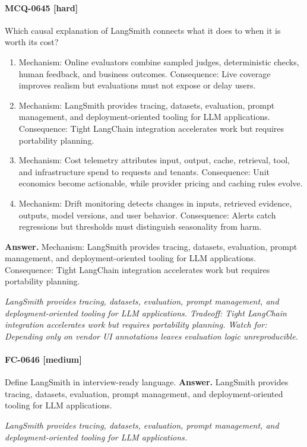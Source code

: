 \paragraph{MCQ-0645 [hard]} Which causal explanation of LangSmith connects what it does to when it is worth its cost?
\begin{enumerate}[label=\Alph*.]
\item Mechanism: Online evaluators combine sampled judges, deterministic checks, human feedback, and business outcomes. Consequence: Live coverage improves realism but evaluations must not expose or delay users.
\item Mechanism: LangSmith provides tracing, datasets, evaluation, prompt management, and deployment-oriented tooling for LLM applications. Consequence: Tight LangChain integration accelerates work but requires portability planning.
\item Mechanism: Cost telemetry attributes input, output, cache, retrieval, tool, and infrastructure spend to requests and tenants. Consequence: Unit economics become actionable, while provider pricing and caching rules evolve.
\item Mechanism: Drift monitoring detects changes in inputs, retrieved evidence, outputs, model versions, and user behavior. Consequence: Alerts catch regressions but thresholds must distinguish seasonality from harm.
\end{enumerate}
\noindent\textbf{Answer.} Mechanism: LangSmith provides tracing, datasets, evaluation, prompt management, and deployment-oriented tooling for LLM applications. Consequence: Tight LangChain integration accelerates work but requires portability planning.
\par\textit{LangSmith provides tracing, datasets, evaluation, prompt management, and deployment-oriented tooling for LLM applications. Tradeoff: Tight LangChain integration accelerates work but requires portability planning. Watch for: Depending only on vendor UI annotations leaves evaluation logic unreproducible.}
\paragraph{FC-0646 [medium]} Define LangSmith in interview-ready language.
\noindent\textbf{Answer.} LangSmith provides tracing, datasets, evaluation, prompt management, and deployment-oriented tooling for LLM applications.
\par\textit{LangSmith provides tracing, datasets, evaluation, prompt management, and deployment-oriented tooling for LLM applications.}

